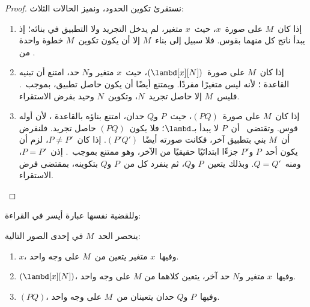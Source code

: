 \documentclass[../../../include/open-logic-section]{subfiles}
\begin{document}
\begin{proof}
  نستقرئ تكوين الحدود، ونميز الحالات الثلاث:
  \begin{enumerate}
    \item إذا كان~$M$ على صورة~$x$، حيث~$x$ متغير،
      لم يدخل التجريد ولا التطبيق في بنائه؛ إذ يبدأ ناتج كل منهما بقوس.
      فلا سبيل إلى بناء~$M$ إلا أن يكون تكوين~$M$ خطوة واحدة من
      .
    \item إذا كان~$M$ على صورة~$(\lambd[x][N])$، حيث~$x$ متغير و$N$ حد،
      امتنع أن تبنيه القاعدة
      ؛ لأنه ليس متغيرًا مفردًا.
      ويمتنع أيضًا أن يكون حاصل تطبيق، بموجب~.
      فليس~$M$ إلا حاصل تجريد~$N$، وتكوين~$N$ وحيد بفرض الاستقراء.
    \item إذا كان~$M$ على صورة~$(PQ)$، حيث~$P$ و$Q$ حدان،
      امتنع بناؤه بالقاعدة
      ، لأن أوله قوس.
      وتقتضي~ أن~$P$ لا يبدأ بـ$\lambd$؛
      فلا يكون~$(PQ)$ حاصل تجريد. فلنفرض أن~$M$ بني بتطبيق آخر،
      فكانت صورته أيضًا~$(P'Q')$. إذا كان~$P \neq
      P'$، لزم أن يكون أحد~$P$ و$P'$
      جزءًا ابتدائيًا حقيقيًا من الآخر، وهو ممتنع بموجب~.
      إذن~$P=P'$، ومنه~$Q=Q'$. وبذلك يتعين~$P$ و$Q$،
      ثم ينفرد كل من~$P$ و$Q$ بتكوينه، بمقتضى فرض الاستقراء.
  \end{enumerate}
\end{proof}

وللقضية نفسها عبارة أيسر في القراءة:
\begin{prop}
  ينحصر الحد~$M$ في إحدى الصور التالية:
  \begin{enumerate}
    \item $x$، وفيها~$x$ متغير يتعين من~$M$ على وجه واحد.
    \item $(\lambd[x][N])$، وفيها~$x$ متغير و$N$ حد آخر، يتعين كلاهما من
      $M$ على وجه واحد.
    \item $(PQ)$، وفيها~$P$ و$Q$ حدان يتعينان من~$M$ على وجه واحد.
  \end{enumerate}
\end{prop}
\end{document}
